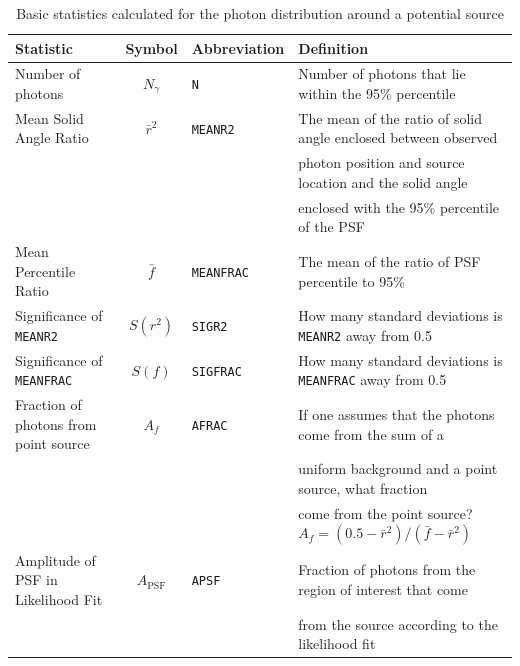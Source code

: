\documentclass[useAMS,usenatbib]{mn2e}
\begin{document}
\begin{table}
  \caption{Basic statistics calculated for the photon distribution around a potential source}
  \label{tab:stats}
  \begin{tabular}{l|cll}
    \hline
    Statistic & Symbol & Abbreviation & Definition \\
    \hline
    Number of photons                     &  $N_\gamma$ & \texttt{N}        & Number of photons that lie within the 95\% percentile \\
    Mean Solid Angle Ratio                &  $\bar r^2$          & \texttt{MEANR2}   & The mean of the ratio of solid angle enclosed between observed \\
                                          &                      &                   & photon position and source location and the solid angle \\
                                          &                      &                   & enclosed with the 95\% percentile of the PSF \\
    Mean Percentile Ratio                 &  $\bar f$            & \texttt{MEANFRAC} & The mean of the ratio of PSF percentile to 95\% \\
    Significance of \texttt{MEANR2}       & $S(r^2)$             & \texttt{SIGR2}    & How many standard deviations is \texttt{MEANR2} away from 0.5 \\
    Significance of \texttt{MEANFRAC}     & $S(f)$               & \texttt{SIGFRAC}  & How many standard deviations is \texttt{MEANFRAC} away from 0.5 \\
    Fraction of photons from point source & $A_f$                & \texttt{AFRAC}    & If one assumes that the photons come from the sum of a  \\
                                          &                      &                   & uniform background and a point source, what fraction \\
                                          &                      &                   & come from the point source? $A_f=(0.5-\bar r^2)/(\bar f-\bar r^2)$ \\
    Amplitude of PSF in Likelihood Fit      & $A_\mathrm{PSF}$      & \texttt{APSF}     & Fraction of photons from the region of interest that come \\
                                          &                      &                   & from the source according to the likelihood fit \\
  \end{tabular}
\end{table}
\end{document}
